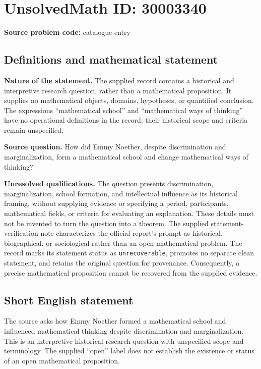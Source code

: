 \documentclass[11pt]{article}
\begin{document}
\section*{UnsolvedMath ID: 30003340}
\textbf{Source problem code:} catalogue entry
\subsection{Definitions and mathematical statement}
\textbf{Nature of the statement.} The supplied record contains a historical and interpretive research question, rather than a mathematical proposition. It supplies no mathematical objects, domains, hypotheses, or quantified conclusion. The expressions ``mathematical school'' and ``mathematical ways of thinking'' have no operational definitions in the record; their historical scope and criteria remain unspecified.

\textbf{Source question.} How did Emmy Noether, despite discrimination and marginalization, form a mathematical school and change mathematical ways of thinking?

\textbf{Unresolved qualifications.} The question presents discrimination, marginalization, school formation, and intellectual influence as its historical framing, without supplying evidence or specifying a period, participants, mathematical fields, or criteria for evaluating an explanation. These details must not be invented to turn the question into a theorem. The supplied statement-verification note characterizes the official report's prompt as historical, biographical, or sociological rather than an open mathematical problem. The record marks its statement status as \texttt{unrecoverable}, promotes no separate clean statement, and retains the original question for provenance. Consequently, a precise mathematical proposition cannot be recovered from the supplied evidence.
\subsection{Short English statement}
The source asks how Emmy Noether formed a mathematical school and influenced mathematical thinking despite discrimination and marginalization. This is an interpretive historical research question with unspecified scope and terminology. The supplied ``open'' label does not establish the existence or status of an open mathematical proposition.
\end{document}
